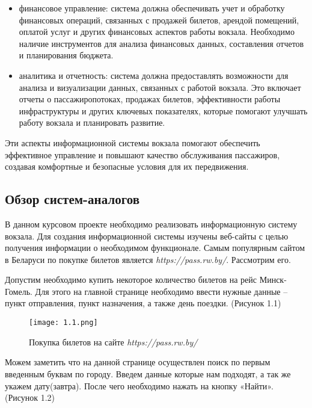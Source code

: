 \begin{itemize}
    \item финансовое управление: система должна обеспечивать учет и обработку финансовых операций, связанных с продажей билетов, арендой помещений, оплатой услуг и других финансовых аспектов работы вокзала. Необходимо наличие инструментов для анализа финансовых данных, составления отчетов и планирования бюджета.

    \item аналитика и отчетность: система должна предоставлять возможности для анализа и визуализации данных, связанных с работой вокзала. Это включает отчеты о пассажиропотоках, продажах билетов, эффективности работы инфраструктуры и других ключевых показателях, которые помогают улучшать работу вокзала и планировать развитие.

\end{itemize}

Эти аспекты информационной системы вокзала помогают обеспечить эффективное управление и повышают качество обслуживания пассажиров, создавая комфортные и безопасные условия для их передвижения.

\subsection{Обзор систем-аналогов}

В данном курсовом проекте необходимо реализовать информационную систему вокзала. Для создания информационной системы изучены веб-сайты с целью получения информации о необходимом функционале. Самым популярным сайтом в Беларуси по покупке билетов является \textit{https://pass.rw.by/}. Рассмотрим его.

Допустим необходимо купить некоторое количество билетов на рейс Минск-Гомель. Для этого на главной странице необходимо ввести нужные данные – пункт отправления, пункт назначения, а также день поездки. (Рисунок 1.1) \\

\begin{figure}[h]
    \centering
    \texttt{[image: 1.1.png]}
    \caption{Покупка билетов на сайте \textit{https://pass.rw.by/}}
  \end{figure} 

Можем заметить что на данной странице осуществлен поиск по первым введенным буквам по городу. Введем данные которые нам подходят, а так же укажем дату(завтра). После чего необходимо нажать на кнопку «Найти». (Рисунок 1.2)\\

